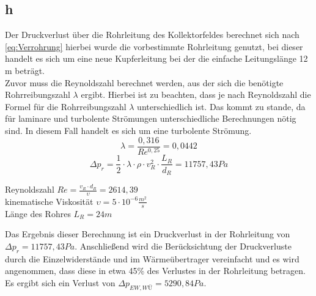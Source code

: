 \subsection{h}
Der Druckverlust über die Rohrleitung des Kollektorfeldes berechnet sich nach \autoref{eq:Verrohrung}
hierbei wurde die vorbestimmte Rohrleitung genutzt, bei dieser handelt es sich um eine neue Kupferleitung
bei der die einfache Leitungslänge 12 m beträgt.\\
Zuvor muss die Reynoldszahl berechnet werden, aus der sich die benötigte Rohrreibungszahl $\lambda$ 
ergibt. Hierbei ist zu beachten, dass je nach Reynoldszahl die Formel für die Rohrreibungszahl $\lambda$
unterschiedlich ist. Das kommt zu stande, da für laminare und turbolente Strömungen unterschiedliche
Berechnungen nötig sind. In diesem Fall handelt es sich um eine turbolente Strömung.\\
\begin{equation}
    \lambda =  \frac{0,316}{Re^{0,25}} = 0,0442
\end{equation}
\begin{equation}
    \Delta p_r = \frac{1}{2} \cdot \lambda \cdot \rho \cdot v^2_R \cdot \frac{L_R}{d_R} = 11757,43 Pa
        \label{eq:Verrohrung}
\end{equation}
\vspace{\baselineskip}
\begin{center}
    Reynoldszahl $Re = \frac{v_R \cdot d_R}{\upsilon} = 2614,39$\\
    kinematische Viskosität $\upsilon =5 \cdot 10^{-6} \frac{m^2}{s}$\\
    Länge des Rohres $L_R = 24 m$
\end{center}

Das Ergebnis dieser Berechnung ist ein Druckverlust in der Rohrleitung von $\Delta p_r = 11757,43 Pa$.
Anschließend wird die Berücksichtung der Druckverluste durch die Einzelwiderstände und im Wärmeübertrager
vereinfacht und es wird angenommen, dass diese in etwa 45\% des Verlustes in der Rohrleitung betragen.
Es ergibt sich ein Verlust von $\Delta p_{EW,WÜ} = 5290,84 Pa$.